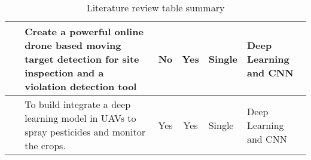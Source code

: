 \documentclass{article}
\begin{document}
\begin{table}[hbt!]
\begin{tabular}{ | c | P{4cm} | c | c | P{2.4cm} | P{2.5cm} |}
			~\cite{wang-3-2018-online} & Create a powerful online drone based moving target detection for site inspection and a violation detection tool & No & Yes & Single & Deep Learning and CNN \\ \hline
			
			~\cite{khan-3-2021-real}  & To build integrate a deep learning model in UAVs to spray pesticides and monitor the crops.& Yes & Yes & Single & Deep Learning and CNN \\ \hline
		\end{tabular}
	 \caption{Literature review table summary}
	\end{table}	\label{tab: literature-review-summary} 
		
	
	
\end{document}
